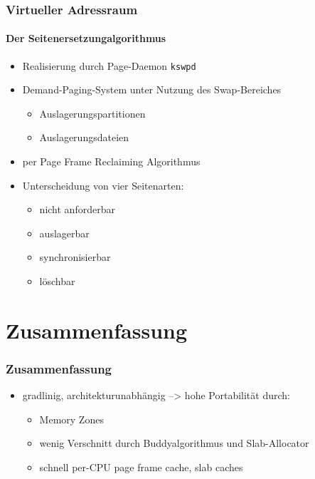 \documentclass[ddcfooter,nosectionnum]{tudbeamer}
\begin{document}
\begin{frame}
 
    \frametitle {Virtueller Adressraum}
    
    \framesubtitle {Der Seitenersetzungalgorithmus}
    \begin{itemize}
       
	 \item Realisierung durch Page-Daemon \texttt{kswpd}
	 \item Demand-Paging-System unter Nutzung des Swap-Bereiches
	 \begin{itemize}
	 	\item Auslagerungspartitionen 
		\item Auslagerungsdateien
	\end{itemize}
		
		\item per Page Frame Reclaiming Algorithmus
		\item Unterscheidung von vier Seitenarten:
		\begin{itemize}
			\item nicht anforderbar
			\item auslagerbar
			\item synchronisierbar
			\item löschbar
		\end{itemize}	
	\end{itemize}	
		  
    
\end{frame}

\section{Zusammenfassung}
\begin{frame}
    \frametitle{Zusammenfassung}
    \begin{itemize}
    	\item gradlinig, architekturunabhängig --> hohe Portabilität durch:
		\begin{itemize}
			\item Memory Zones
			\item wenig Verschnitt durch Buddyalgorithmus und Slab-Allocator
			\item schnell per-CPU page frame cache, slab caches
		\end{itemize}
    \end{itemize}
    
\end{frame}
\end{document}
